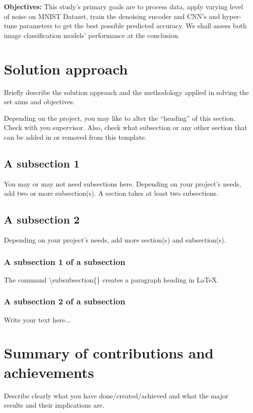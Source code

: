 \textbf{Objectives:} This study's primary goals are to process data, apply varying level of noise on MNIST Dataset, train the denoising encoder and CNN's and hyper-tune parameters to get the best possible predicted accuracy. We shall assess both image classification models' performance at the conclusion.


\section{Solution approach}
\label{sec:intro_sol} %
Briefly describe the solution approach and the methodology applied in solving the set aims and objectives.

Depending on the project, you may like to alter the ``heading'' of this section. Check with you supervisor. Also, check what subsection or any other section that can be added in or removed from this template.

\subsection{A subsection 1}
\label{sec:intro_some_sub1}
You may or may not need subsections here. Depending on your project's needs, add two or more subsection(s). A section takes at least two subsections. 

\subsection{A subsection 2}
\label{sec:intro_some_sub2}
Depending on your project's needs, add more section(s) and subsection(s).

\subsubsection{A subsection 1 of a subsection}
\label{sec:intro_some_subsub1}
The command \textbackslash subsubsection\{\} creates a paragraph heading in \LaTeX.

\subsubsection{A subsection 2 of a subsection}
\label{sec:intro_some_subsub2}
Write your text here...

\section{Summary of contributions and achievements} %
\label{sec:intro_sum_results} %
Describe clearly what you have done/created/achieved and what the major results and their implications are. 


